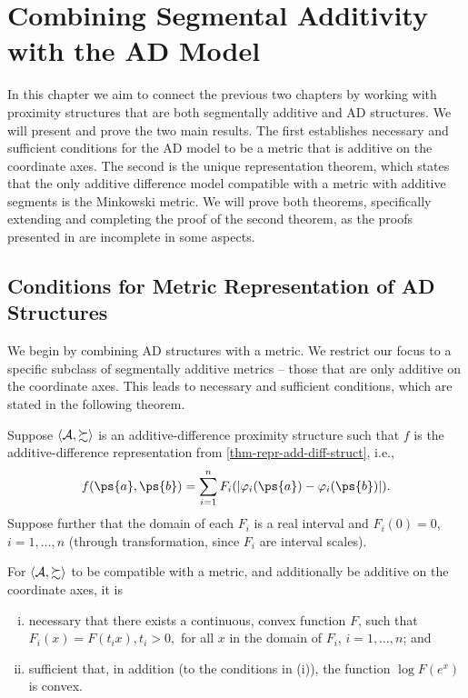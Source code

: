 \chapter{Combining Segmental Additivity with the AD Model} \label{chap-combination}

In this chapter we aim to connect the previous two chapters by working with proximity structures that are both segmentally additive and AD structures. We will present and prove the two main results. 
The first establishes necessary and sufficient conditions for the AD model to be a metric that is additive on the coordinate axes.
The second is the unique representation theorem, which states that the only additive difference model compatible with a metric with additive segments is the Minkowski metric.
We will prove both theorems, specifically extending and completing the proof of the second theorem, as the proofs presented in \textcite[pp. 192-199]{foundations2} are incomplete in some aspects.

\section{Conditions for Metric Representation of AD Structures} \label{sec-conds}

We begin by combining AD structures with a metric. We restrict our focus to a specific subclass of segmentally additive metrics -- those that are only additive on the coordinate axes. This leads to necessary and sufficient conditions, which are stated in the following theorem.

\begin{thm} \label{thm-conds}
	Suppose $\langle \mathcal{A}, \succsim \rangle$ is an additive-difference proximity structure such that $f$ is the additive-difference representation from \cref{thm-repr-add-diff-struct}, i.e.,
	$$
		f(\ps{a}, \ps{b}) = \sum_{i=1}^{n} F_i(|\varphi_i(\ps{a}) - \varphi_i(\ps{b})|).
	$$
	Suppose further that the domain of each $F_i$ is a real interval and $F_i(0) = 0$, $i = 1, \ldots, n$ (through transformation, since $F_i$ are interval scales).

	For $\langle \mathcal{A}, \succsim \rangle$ to be compatible with a metric, and additionally be additive on the coordinate axes, it is
  \begin{enumerate}[(i)]
		\item necessary that there exists a continuous, convex function $F$, such that $F_i(x) = F(t_i x), t_i > 0,$ for all $x$ in the domain of $F_i$, $i = 1, \ldots, n$; and \label{thm-necc-cond}
		\item sufficient that, in addition (to the conditions in (i)), the function $\log F(e^x)$ is convex. \label{thm-suff-cond}
	\end{enumerate}
\end{thm}

